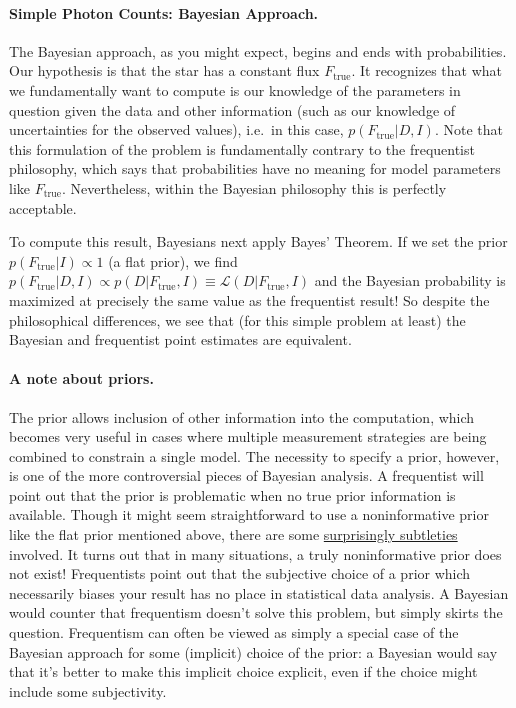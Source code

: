\documentclass[%
oneside,                 %
final,                   %
10pt]{article}
\begin{document}
\paragraph{Simple Photon Counts: Bayesian Approach.}
The Bayesian approach, as you might expect, begins and ends with probabilities. Our hypothesis is that the star has a constant flux $F_\mathrm{true}$. It recognizes that what we fundamentally want to compute is our knowledge of the parameters in question given the data and other information (such as our knowledge of uncertainties for the observed values), i.e.~in this case, $p(F_\mathrm{true} | D,I)$.
Note that this formulation of the problem is fundamentally contrary to the frequentist philosophy, which says that probabilities have no meaning for model parameters like $F_\mathrm{true}$. Nevertheless, within the Bayesian philosophy this is perfectly acceptable.

To compute this result, Bayesians next apply Bayes' Theorem.
If we set the prior $p(F_\mathrm{true}|I) \propto 1$ (a flat prior), we find
$p(F_\mathrm{true}|D,I) \propto p(D | F_\mathrm{true},I) \equiv \mathcal{L}(D | F_\mathrm{true},I)$
and the Bayesian probability is maximized at precisely the same value as the frequentist result! So despite the philosophical differences, we see that (for this simple problem at least) the Bayesian and frequentist point estimates are equivalent.

\paragraph{A note about priors.}
The prior allows inclusion of other information into the computation, which becomes very useful in cases where multiple measurement strategies are being combined to constrain a single model. The necessity to specify a prior, however, is one of the more controversial pieces of Bayesian analysis.
A frequentist will point out that the prior is problematic when no true prior information is available. Though it might seem straightforward to use a noninformative prior like the flat prior mentioned above, there are some \href{{http://normaldeviate.wordpress.com/2013/07/13/lost-causes-in-statistics-ii-noninformative- priors/comment-page-1/}}{surprisingly subtleties} involved. It turns out that in many situations, a truly noninformative prior does not exist! Frequentists point out that the subjective choice of a prior which necessarily biases your result has no place in statistical data analysis.
A Bayesian would counter that frequentism doesn't solve this problem, but simply skirts the question. Frequentism can often be viewed as simply a special case of the Bayesian approach for some (implicit) choice of the prior: a Bayesian would say that it's better to make this implicit choice explicit, even if the choice might include some subjectivity.
\end{document}
